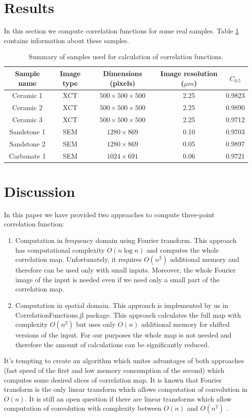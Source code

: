 \documentclass[1p]{elsarticle}
\begin{document}
\section{Results}
In this section we compute correlation functions for some real samples. Table
\ref{tab:summary} contains information about these samples.
\begin{table}[!htp]
  \centering
  \begin{tabular}{|c|c|c|c|c|}
    \hline
    Sample name & Image type & Dimensions (pixels) & Image resolution ($\mu m$) & $C_{0.5}$\\
    \hline
    Ceramic 1   & XCT & $500 \times 500 \times 500$ & 2.25 & 0.9823 \\
    Ceramic 2   & XCT & $500 \times 500 \times 500$ & 2.25 & 0.9890 \\
    Ceramic 3   & XCT & $500 \times 500 \times 500$ & 2.25 & 0.9712 \\
    Sandstone 1 & SEM &  $1280 \times 869$ & 0.10 & 0.9703 \\
    Sandstone 2 & SEM &  $1280 \times 869$ & 0.05 & 0.9897 \\
    Carbonate 1 & SEM &  $1024 \times 691$ & 0.06 & 0.9721 \\
    \hline
  \end{tabular}
  \caption{Summary of samples used for calculation of correlation functions.}
  \label{tab:summary}
\end{table}


\section{Discussion}
In this paper we have provided two approaches to compute three-point correlation
function:
\begin{enumerate}
\item Computation in frequency domain using Fourier transform. This approach has
  computational complexity $O(n \log n)$ and computes the whole correlation
  map. Unfortunately, it requires $O(n^2)$ additional memory and therefore can
  be used only with small inputs. Moreover, the whole Fourier image of the input
  is needed even if we need only a small part of the correlation map.
\item Computation in spatial domain. This approach is implemented by us in
  CorrelationFunctions.jl package. This approach calculates the full map with
  complexity $O(n^2)$ but uses only $O(n)$ additional memory for shifted
  versions of the input. For our purposes the whole map is not needed and
  therefore the amount of calculations can be significantly reduced.
\end{enumerate}
It's tempting to create an algorithm which unites advantages of both approaches
(fast speed of the first and low memory consumption of the second) which
computes some desired slices of correlation map. It is known that Fourier
transform is the only linear transform which allows computation of convolution
in $O(n)$. It is still an open question if there are linear transforms which
allow computation of convolution with complexity between $O(n)$ and $O(n^2)$
\cite{stone2008uniqueness,stone1998convolution}.
\end{document}
